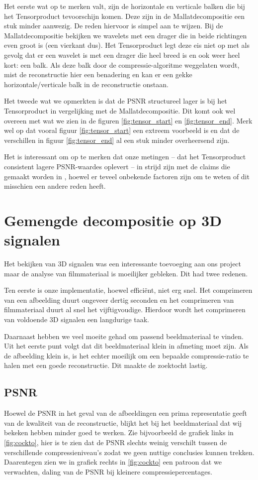 Het eerste wat op te merken valt, zijn de horizontale en verticale balken die bij het Tensorproduct 
tevoorschijn komen. Deze zijn in de Mallatdecompositie een stuk minder aanwezig. De reden 
hiervoor is simpel aan te wijzen. Bij de Mallatdecompositie bekijken we wavelets met een 
drager die in beide richtingen even groot is (een vierkant dus). Het Tensorproduct legt deze eis 
niet op met als gevolg dat er een wavelet is met een drager die heel breed is en ook weer 
heel kort: een balk. Als deze balk door de compressie-algoritme weggelaten wordt, mist de 
reconstructie hier een benadering en kan er een gekke horizontale/verticale balk in de reconstructie onstaan.

Het tweede wat we opmerkten is dat de PSNR structureel lager is bij het Tensorproduct in vergelijking 
met de Mallatdecompositie. Dit komt ook wel overeen met wat we zien in de figuren \ref{fig:tensor_start} 
en \ref{fig:tensor_end}. Merk wel op dat vooral figuur \ref{fig:tensor_start} een extreem voorbeeld 
is en dat de verschillen in figuur \ref{fig:tensor_end} al een stuk minder overheersend zijn.

Het is interessant om op te merken dat onze metingen -- dat het Tensorproduct consistent lagere 
PSNR-waardes oplevert -- in strijd zijn met de claims die gemaakt worden in \cite{tensor_vs_mallat}, 
hoewel er teveel onbekende factoren zijn om te weten of dit misschien een andere reden heeft.

\section{Gemengde decompositie op 3D signalen}
Het bekijken van 3D signalen was een interessante toevoeging aan ons project maar de analyse  
van filmmateriaal is moeilijker gebleken. Dit had twee redenen.

Ten eerste is onze implementatie, hoewel effici\"ent, niet erg snel. Het comprimeren van een 
afbeelding duurt ongeveer dertig seconden en het comprimeren van filmmateriaal duurt al snel het 
vijftigvoudige. Hierdoor wordt het comprimeren van voldoende 3D signalen een langdurige taak.

Daarnaast hebben we veel moeite gehad om passend beeldmateriaal te vinden. Uit het eerste punt volgt 
dat dit beeldmateriaal klein in afmeting moet zijn. Als de afbeelding klein is, is het echter moeilijk
om een bepaalde compressie-ratio te halen met een goede reconstructie. Dit maakte de zoektocht lastig.

\subsection{PSNR}
\vspace{-10pt}
Hoewel de PSNR in het geval van de afbeeldingen een prima representatie geeft van de kwaliteit van de 
reconstructie, blijkt het bij het beeldmateriaal dat wij bekeken hebben minder goed te werken. 
Zie bijvoorbeeld de grafiek links in \ref{fig:cockto}, hier is te zien dat de PSNR slechts weinig verschilt
tussen de verschillende compressieniveau's zodat we geen nuttige conclusies kunnen trekken.
Daarentegen zien we in grafiek rechts in \ref{fig:cockto} een patroon dat we verwachten, daling van de PSNR
bij kleinere compressiepercentages.

